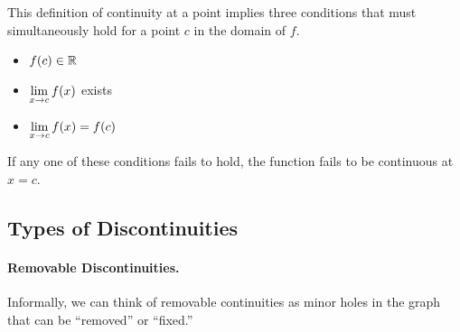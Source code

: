 \documentclass[12pt]{article}
\begin{document}
\vspace{5mm}

This definition of continuity at a point implies three conditions that must simultaneously hold for a point $c$ in the domain of $f$.
\begin{itemize}
	\item[\tc{1}] $f(c)\in\mathbb{R}$
	\item[\tc{2}] $\displaystyle\lim_{x\to c} f(x)$ exists
	\item[\tc{3}] $\displaystyle\lim_{x\to c} f(x)=f(c)$
\end{itemize}

If any one of these conditions fails to hold, the function fails to be continuous at $x=c$. 

\newpage

\subsection*{Types of Discontinuities}

\paragraph{Removable Discontinuities.} Informally, we can think of removable continuities as minor holes in the graph that can be ``removed'' or ``fixed.''

\begin{center}
        \end{center}
        
\end{document}
